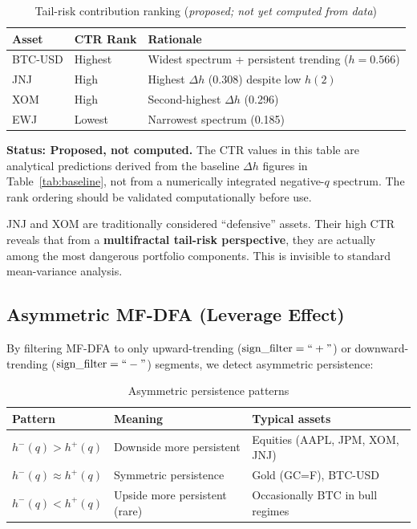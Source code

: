 \documentclass[11pt,a4paper]{article}
\begin{document}
\begin{table}[H]
\centering
\caption{Tail-risk contribution ranking (\textit{proposed; not yet computed from data})}
\begin{tabular}{llp{7cm}}
\toprule
\textbf{Asset} & \textbf{CTR Rank} & \textbf{Rationale} \\
\midrule
BTC-USD & Highest & Widest spectrum + persistent trending ($h = 0.566$) \\
JNJ     & High    & Highest $\Delta h$ (0.308) despite low $h(2)$ \\
XOM     & High    & Second-highest $\Delta h$ (0.296) \\
EWJ     & Lowest  & Narrowest spectrum (0.185) \\
\bottomrule
\end{tabular}
\end{table}

\begin{warningbox}
\textbf{Status: Proposed, not computed.} The CTR values in this table are analytical predictions derived from the baseline $\Delta h$ figures in Table~\ref{tab:baseline}, not from a numerically integrated negative-$q$ spectrum. The rank ordering should be validated computationally before use.
\end{warningbox}

\begin{warningbox}
JNJ and XOM are traditionally considered ``defensive'' assets. Their high CTR reveals that from a \textbf{multifractal tail-risk perspective}, they are actually among the most dangerous portfolio components. This is invisible to standard mean-variance analysis.
\end{warningbox}

\subsection{Asymmetric MF-DFA (Leverage Effect)}

By filtering MF-DFA to only upward-trending ($\text{sign\_filter} = ``+"$) or downward-trending ($\text{sign\_filter} = ``-"$) segments, we detect asymmetric persistence:

\begin{table}[H]
\centering
\caption{Asymmetric persistence patterns}
\begin{tabular}{lll}
\toprule
\textbf{Pattern} & \textbf{Meaning} & \textbf{Typical assets} \\
\midrule
$h^-(q) > h^+(q)$ & Downside more persistent & Equities (AAPL, JPM, XOM, JNJ) \\
$h^-(q) \approx h^+(q)$ & Symmetric persistence & Gold (GC=F), BTC-USD \\
$h^-(q) < h^+(q)$ & Upside more persistent (rare) & Occasionally BTC in bull regimes \\
\bottomrule
\end{tabular}
\end{table}
\end{document}
